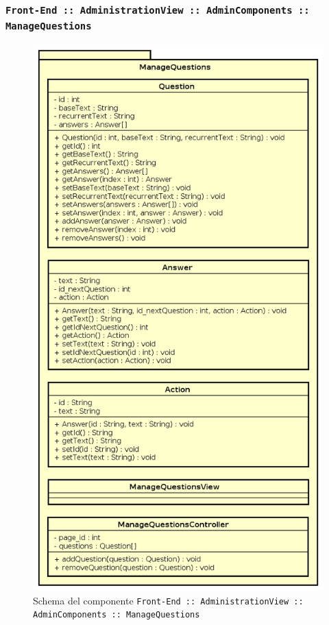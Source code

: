 \documentclass[../DefinizioneDiProdotto.tex]{subfiles}
\begin{document}
	\subsubsection{ \texttt{Front-End :: AdministrationView :: AdminComponents :: ManageQuestions}}
		\begin{figure}[!h]
			\centering
			\includegraphics[scale=0.5]{Architettura/Front-End/Administration/AdminComponents/ManageQuestions.png}
			\caption{Schema del componente \texttt{Front-End :: AdministrationView :: AdminComponents :: ManageQuestions}}
		\end{figure}
\end{document}
